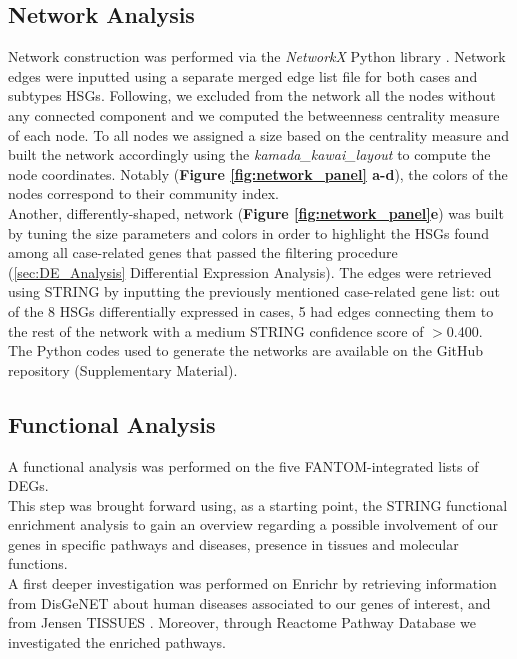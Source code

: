 \documentclass[10pt]{SelfArx} %
\begin{document}
\subsection{Network Analysis}\label{sec:network_analysis}
Network construction was performed via the \textit{NetworkX} \cite{hagberg2008exploring} Python library \cite{van1995python}.
Network edges were inputted using a separate merged edge list file for both cases and subtypes HSGs.
Following, we excluded from the network all the nodes without any connected component and we computed the betweenness centrality measure of each node. To all nodes we assigned a size based on the centrality measure and built the network accordingly using the \textit{kamada\_kawai\_layout} to compute the node coordinates. Notably (\textbf{Figure \ref{fig:network_panel} a-d}), the colors of the nodes correspond to their community index.
\\
Another, differently-shaped, network (\textbf{Figure \ref{fig:network_panel}e}) was built by tuning the size parameters and colors in order to highlight the HSGs found among all case-related genes that passed the filtering procedure (\ref{sec:DE_Analysis} Differential Expression Analysis). The edges were retrieved using STRING \cite{szklarczyk2019string} by inputting the previously mentioned case-related gene list: out of the 8 HSGs differentially expressed in cases, 5 had edges connecting them to the rest of the network with a medium STRING confidence score of $>$0.400. \\
The Python codes used to generate the networks are available on the GitHub repository (Supplementary Material).

\subsection{Functional Analysis}\label{sec:functional_analysis}
A functional analysis was performed on the five FANTOM-integrated \cite{fantom5} lists of DEGs.\\
This step was brought forward using, as a starting point, the STRING \cite{szklarczyk2019string} functional enrichment analysis to gain an overview regarding a possible involvement of our genes in specific pathways and diseases, presence in tissues and molecular functions.\\
A first deeper investigation was performed on Enrichr \cite{kuleshov2016enrichr} by retrieving information from DisGeNET \cite{pinero2016disgenet} about human diseases associated to our genes of interest, and from  Jensen TISSUES \cite{10.1093/database/bay003}.
Moreover, through Reactome Pathway Database \cite{gillespie2022reactome} we investigated the enriched pathways.\\
\end{document}
